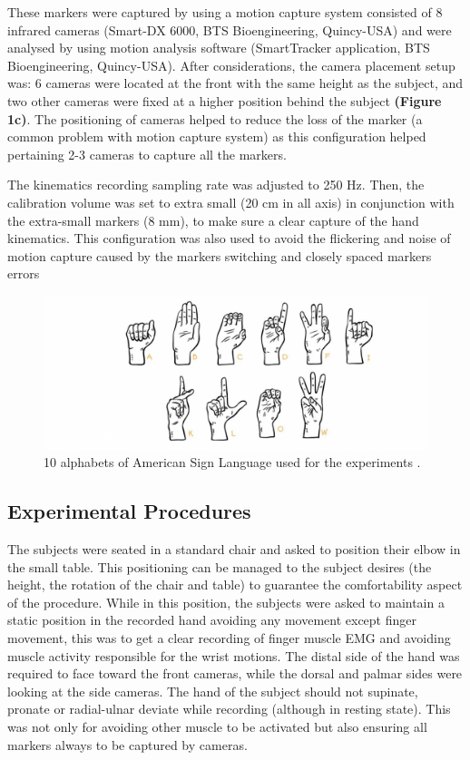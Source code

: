 \documentclass[conference]{IEEEtran}
\begin{document}
These markers were captured by using a motion capture system consisted of 8 infrared cameras (Smart-DX 6000, BTS Bioengineering, Quincy-USA) and were analysed by using motion analysis software
(SmartTracker application, BTS Bioengineering, Quincy-USA). After considerations, the camera placement 
setup was: 6 cameras were located at the front with the same height as the subject, and two other cameras 
were fixed at a higher position behind the subject \textbf{(Figure 1c)}. The positioning of cameras helped to reduce 
the loss of the marker (a common problem with motion capture system) as this configuration helped 
pertaining 2-3 cameras to capture all the markers.

The kinematics recording sampling rate was adjusted to 250 Hz. Then, the calibration volume was set 
to extra small (20 cm in all axis) in conjunction with the extra-small markers (8 mm), to make sure a clear 
capture of the hand kinematics. This configuration was also used to avoid the flickering and noise of motion 
capture caused by the markers switching and closely spaced markers errors

\begin{figure}[htbp]
\centerline{\includegraphics[width=\columnwidth]{figure2.png}}
\caption{10 alphabets of American Sign Language used for the experiments \cite{b26}.}
\label{figure2}
\end{figure}

\subsection{Experimental Procedures}
The subjects were seated in a standard chair and asked to position their elbow in the small table. This 
positioning can be managed to the subject desires (the height, the rotation of the chair and table) to guarantee
the comfortability aspect of the procedure. While in this position, the subjects were asked to maintain a static 
position in the recorded hand avoiding any movement except finger movement, this was to get a clear 
recording of finger muscle EMG and avoiding muscle activity responsible for the wrist motions. The distal 
side of the hand was required to face toward the front cameras, while the dorsal and palmar sides were
looking at the side cameras. The hand of the subject should not supinate, pronate or radial-ulnar deviate 
while recording (although in resting state). This was not only for avoiding other muscle to be activated but
also ensuring all markers always to be captured by cameras.
\end{document}
